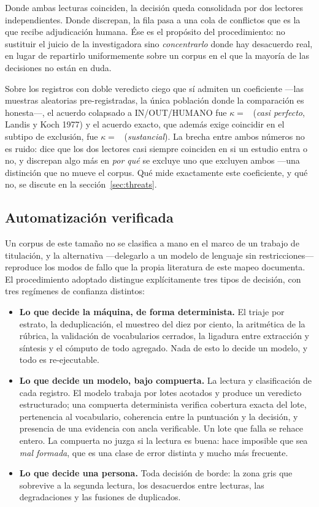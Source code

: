 \documentclass[conference]{IEEEtran}
\begin{document}
Donde ambas lecturas coinciden, la decisión queda consolidada por dos lectores independientes. Donde
discrepan, la fila pasa a una cola de conflictos que es la que recibe adjudicación humana. Ése es el
propósito del procedimiento: no sustituir el juicio de la investigadora sino \emph{concentrarlo}
donde hay desacuerdo real, en lugar de repartirlo uniformemente sobre un corpus en el que la mayoría
de las decisiones no están en duda.

Sobre los \clFiaN{} registros con doble veredicto ciego que sí admiten un coeficiente —las muestras
aleatorias pre-registradas, la única población donde la comparación es honesta—, el acuerdo colapsado
a IN/OUT/HUMANO fue $\kappa=$~\clFiaKappaColapsado{} (\emph{casi perfecto}, Landis y Koch 1977) y el
acuerdo exacto, que además exige coincidir en el subtipo de exclusión, fue $\kappa=$~\clFiaKappaExacto{}
(\emph{sustancial}). La brecha entre ambos números no es ruido: dice que los dos lectores casi siempre
coinciden en si un estudio entra o no, y discrepan algo más en \emph{por qué} se excluye uno que
excluyen ambos —una distinción que no mueve el corpus. Qué mide exactamente este coeficiente, y qué no,
se discute en la sección~\ref{sec:threats}.

\subsection{Automatización verificada}
\label{sec:automation}

Un corpus de este tamaño no se clasifica a mano en el marco de un trabajo de titulación, y la
alternativa —delegarlo a un modelo de lenguaje sin restricciones— reproduce los modos de fallo que la
propia literatura de este mapeo documenta. El procedimiento adoptado distingue explícitamente tres
tipos de decisión, con tres regímenes de confianza distintos:

\begin{itemize}\itemsep3pt
\item \textbf{Lo que decide la máquina, de forma determinista.} El triaje por estrato, la
      deduplicación, el muestreo del diez por ciento, la aritmética de la rúbrica, la validación de
      vocabularios cerrados, la ligadura entre extracción y síntesis y el cómputo de todo agregado.
      Nada de esto lo decide un modelo, y todo es re-ejecutable.
\item \textbf{Lo que decide un modelo, bajo compuerta.} La lectura y clasificación de cada registro.
      El modelo trabaja por lotes acotados y produce un veredicto estructurado; una compuerta
      determinista verifica cobertura exacta del lote, pertenencia al vocabulario, coherencia entre
      la puntuación y la decisión, y presencia de una evidencia con ancla verificable. Un lote que
      falla se rehace entero. La compuerta no juzga si la lectura es buena: hace imposible que sea
      \emph{mal formada}, que es una clase de error distinta y mucho más frecuente.
\item \textbf{Lo que decide una persona.} Toda decisión de borde: la zona gris que sobrevive a la
      segunda lectura, los desacuerdos entre lecturas, las degradaciones y las fusiones de
      duplicados.
\end{itemize}
\end{document}
